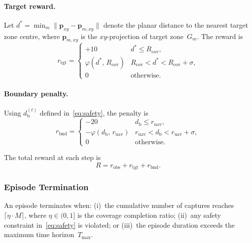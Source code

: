 \paragraph{Target reward.}
Let $d^{*} = \min_{m} \lVert\mathbf{p}_{xy} - \mathbf{p}_{m,xy}\rVert$
denote the planar distance to the nearest target zone centre,
where $\mathbf{p}_{m,xy}$ is the $xy$-projection of target zone~$G_m$.
The reward is
\begin{equation}
  r_{\mathrm{tgt}} =
  \begin{cases}
    +10
    & d^{*} \le R_{\mathrm{cov}}, \\[3pt]
    \varphi(d^{*},\, R_{\mathrm{cov}})
    & R_{\mathrm{cov}} < d^{*} < R_{\mathrm{cov}} + \sigma, \\[3pt]
    0 & \text{otherwise}.
  \end{cases}
  \label{eq:r_tgt}
\end{equation}

\paragraph{Boundary penalty.}
Using $d_{\mathrm{b}}^{(t)}$ defined in~\eqref{eq:safety}, the penalty is
\begin{equation}
  r_{\mathrm{bnd}} =
  \begin{cases}
    -20 & d_{\mathrm{b}} \le r_{\mathrm{uav}}, \\[3pt]
    -\varphi(d_{\mathrm{b}},\, r_{\mathrm{uav}})
    & r_{\mathrm{uav}} < d_{\mathrm{b}} < r_{\mathrm{uav}} + \sigma, \\[3pt]
    0 & \text{otherwise}.
  \end{cases}
  \label{eq:r_bnd}
\end{equation}

The total reward at each step is
\begin{equation}
  R = r_{\mathrm{obs}} + r_{\mathrm{tgt}} + r_{\mathrm{bnd}}.
  \label{eq:total_reward}
\end{equation}

\subsubsection{Episode Termination}
\label{subsubsec:termination}

An episode terminates when:
(i)~the cumulative number of captures reaches
$\lceil \eta \cdot M \rceil$, where $\eta \in (0,1]$ is the coverage
completion ratio;
(ii)~any safety constraint in~\eqref{eq:safety} is violated; or
(iii)~the episode duration exceeds the maximum time horizon~$T_{\max}$.
